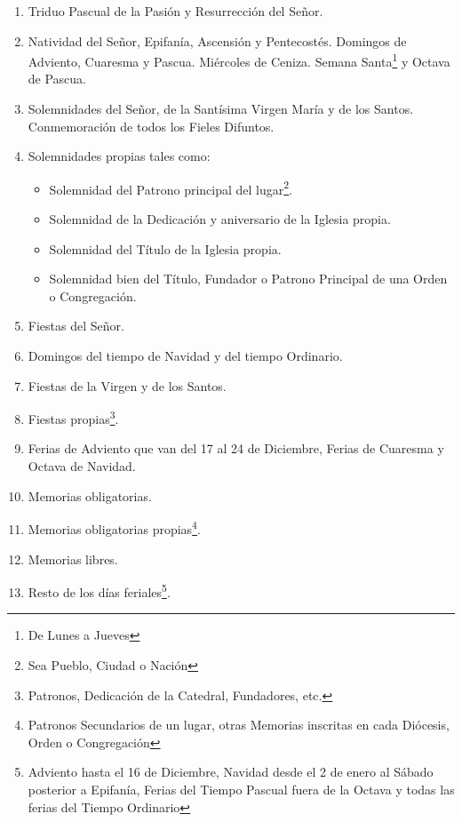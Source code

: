 \documentclass[letterpaper, 12pt]{book}
\begin{document}
    \begin{enumerate}
        \item Triduo Pascual de la Pasi\'on y Resurrecci\'on del Se\~nor.
        \item Natividad del Se\~nor, Epifan\'ia, Ascensi\'on y Pentecost\'es.  Domingos de Adviento, Cuaresma y Pascua. Mi\'ercoles de Ceniza. Semana Santa\footnote{De Lunes a Jueves} y Octava de Pascua.
        \item Solemnidades del Se\~nor, de la Sant\'isima Virgen Mar\'ia y de los Santos. Conmemoraci\'on de todos los Fieles Difuntos.
        \item Solemnidades propias tales como:
            \begin{itemize}
                \item Solemnidad del Patrono principal del lugar\footnote{Sea Pueblo, Ciudad o Naci\'on}.
                \item Solemnidad de la Dedicaci\'on y aniversario de la Iglesia propia. 
                \item Solemnidad del T\'itulo de la Iglesia propia.
                \item Solemnidad bien del T\'itulo, Fundador o Patrono Principal de una Orden o Congregación. 
            \end{itemize}
        \item Fiestas del Se\~nor.
        \item Domingos del tiempo de Navidad y del tiempo Ordinario.
        \item Fiestas de la Virgen y de los Santos.
        \item Fiestas propias\footnote{Patronos, Dedicación de la Catedral, Fundadores, etc.}.
        \item Ferias de Adviento que van del 17 al 24 de Diciembre, Ferias de Cuaresma y Octava de Navidad.
        \item Memorias obligatorias.
        \item Memorias obligatorias propias\footnote{Patronos Secundarios de un lugar, otras Memorias inscritas en cada Diócesis, Orden o Congregación}.
        \item Memorias libres.
        \item Resto de los d\'ias feriales\footnote{Adviento hasta el 16 de Diciembre, Navidad desde el 2 de enero al S\'abado posterior a Epifanía, Ferias del Tiempo Pascual fuera de la Octava y todas las ferias del Tiempo Ordinario}.
    \end{enumerate}
\end{document}
